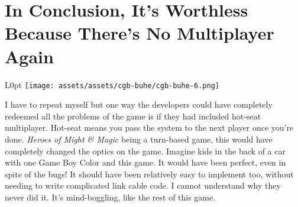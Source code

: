\documentclass{book}
\begin{document}
\FloatBarrier\needspace{10mm}\section*{In Conclusion, It’s Worthless Because There’s No Multiplayer Again}\nopagebreak[4]

\begin{wrapfigure}{L}{0pt} \texttt{[image: assets/assets/cgb-buhe/cgb-buhe-6.png]}\end{wrapfigure}
I have to repeat myself but one way the developers could have completely redeemed all the problems of the game is if they had included hot-seat multiplayer. Hot-seat means you pass the system to the next player once you’re done. \emph{Heroes of Might \& Magic} being a turn-based game, this would have completely changed the optics on the game. Imagine kids in the back of a car with one Game Boy Color and this game. It would have been perfect, even in spite of the bugs! It should have been relatively easy to implement too, without needing to write complicated link cable code. I cannot understand why they never did it. It’s mind-boggling, like the rest of this game.
\end{document}
